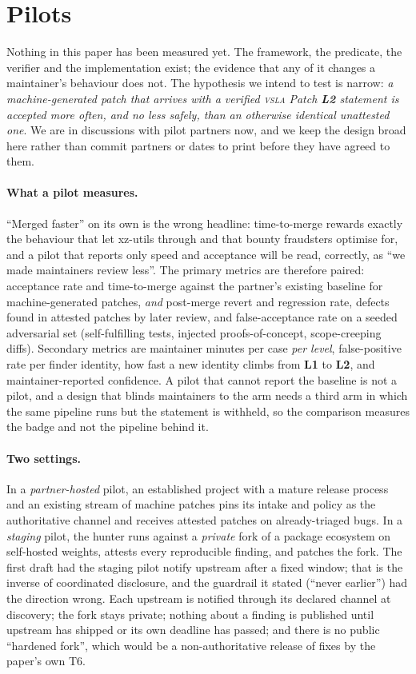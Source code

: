\documentclass[11pt]{article}
\newcommand{\vsla}{\textsc{vsla}}
\newcommand{\lvl}[1]{\textbf{L#1}}
\begin{document}
\section{Pilots}
\label{sec:pilots}

Nothing in this paper has been measured yet. The framework, the predicate, the verifier and the implementation
exist; the evidence that any of it changes a maintainer's behaviour does not. The hypothesis we intend to test is
narrow: \emph{a machine-generated patch that arrives with a verified \vsla{} Patch \lvl{2} statement is accepted
more often, and no less safely, than an otherwise identical unattested one}. We are in discussions with pilot
partners now, and we keep the design broad here rather than commit partners or dates to print before they
have agreed to them.

\paragraph{What a pilot measures.} ``Merged faster'' on its own is the wrong headline: time-to-merge rewards
exactly the behaviour that let xz-utils through and that bounty fraudsters optimise for, and a pilot that
reports only speed and acceptance will be read, correctly, as ``we made maintainers review less''. The primary
metrics are therefore paired: acceptance rate and time-to-merge against the partner's existing baseline for
machine-generated patches, \emph{and} post-merge revert and regression rate, defects found in attested patches
by later review, and false-acceptance rate on a seeded adversarial set (self-fulfilling tests, injected
proofs-of-concept, scope-creeping diffs). Secondary metrics are maintainer minutes per case \emph{per level},
false-positive rate per finder identity, how fast a new identity climbs from \lvl{1} to \lvl{2}, and
maintainer-reported confidence. A pilot that cannot report the baseline is not a pilot, and a design that
blinds maintainers to the arm needs a third arm in which the same pipeline runs but the statement is withheld,
so the comparison measures the badge and not the pipeline behind it.

\paragraph{Two settings.} In a \emph{partner-hosted} pilot, an established project with a mature release
process and an existing stream of machine patches pins its intake and policy as the authoritative channel and
receives attested patches on already-triaged bugs. In a \emph{staging} pilot, the hunter runs against a
\emph{private} fork of a package ecosystem on self-hosted weights, attests every reproducible finding, and
patches the fork. The first draft had the staging pilot notify upstream after a fixed window; that is the
inverse of coordinated disclosure, and the guardrail it stated (``never earlier'') had the direction wrong.
Each upstream is notified through its declared channel at discovery; the fork stays private; nothing about a
finding is published until upstream has shipped or its own deadline has passed; and there is no public
``hardened fork'', which would be a non-authoritative release of fixes by the paper's own T6.
\end{document}
